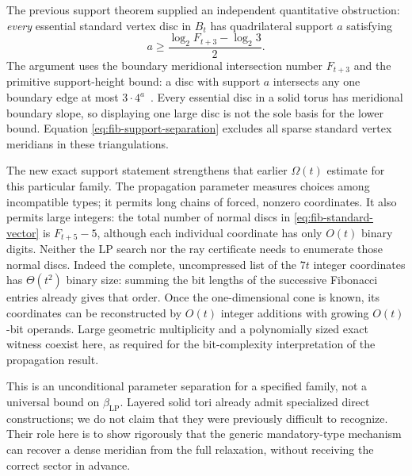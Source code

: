 The previous support theorem supplied an independent quantitative
obstruction: \emph{every} essential standard vertex disc in $B_t$ has
quadrilateral support $a$ satisfying
\begin{equation}
 a\ge\frac{\log_2 F_{t+3}-\log_2 3}{2}.
 \label{eq:fib-support-separation}
\end{equation}
The argument uses the boundary meridional intersection number $F_{t+3}$
and the primitive support-height bound: a disc with support $a$ intersects
any one boundary edge at most $3\cdot4^a$~\cite{priorKernel}.  Every
essential disc in a solid torus has meridional boundary slope, so displaying
one large disc is not the sole basis for the lower bound.  Equation
\eqref{eq:fib-support-separation} excludes all sparse standard vertex
meridians in these triangulations.

The new exact support statement strengthens that earlier
$\Omega(t)$ estimate for this particular family.  The propagation parameter measures
choices among incompatible types; it permits long chains of forced,
nonzero coordinates.  It also permits large integers: the total number of
normal discs in \eqref{eq:fib-standard-vector} is $F_{t+5}-5$, although
each individual coordinate has only $O(t)$ binary digits.  Neither the LP
search nor the ray certificate needs to enumerate those normal discs.
Indeed the complete, uncompressed list of the $7t$ integer coordinates
has $\Theta(t^2)$ binary size: summing the bit lengths of the successive
Fibonacci entries already gives that order.  Once the one-dimensional
cone is known, its coordinates can be reconstructed by $O(t)$ integer
additions with growing $O(t)$-bit operands.  Large geometric multiplicity
and a polynomially sized exact witness coexist here, as required for the
bit-complexity interpretation of the propagation result.

This is an unconditional parameter separation for a specified family,
not a universal bound on $\beta_{\mathrm{LP}}$.  Layered solid tori already
admit specialized direct constructions; we do not claim that they were
previously difficult to recognize.  Their role here is to show rigorously
that the generic mandatory-type mechanism can recover a dense meridian
from the full relaxation, without receiving the correct sector in advance.
